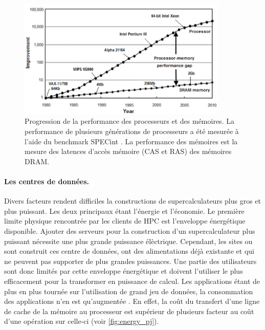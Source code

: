                 
        \begin{figure}
        \center
        \includegraphics[width=10cm]{images/cpu_cpu_vs_memory.png}
        \caption{\label{pic:cpuvsmemory} Progression de la performance des processeurs et des mémoires. La performance de plusieurs générations de processeurs a été mesurée à l'aide du benchmark SPECint \cite{Efnusheva2017ASO}. La performance des mémoires est la mesure des latences d’accès mémoire (CAS et RAS) des mémoires DRAM.}
        \end{figure}
                
             
    
        \paragraph{Les centres de données.} Divers facteurs rendent difficiles la constructions de supercalculateurs plus gros et plus puissant. Les deux principaux étant l'énergie et l'économie. Le première limite physique rencontrée par les clients de HPC est l'enveloppe énergétique disponible. Ajouter des serveurs pour la construction d'un supercalculateur plus puissant nécessite une plus grande puissance élèctrique. Cependant, les sites ou sont construit ces centre de données, ont des alimentations déjà existante et qui ne peuvent pas supporter de plus grandes puissances. Une partie des utilisateurs sont donc limités par cette enveloppe énergétique et doivent l'utiliser le plus efficacement pour la transformer en puissance de calcul. Les applications étant de plus en plus tournée sur l'utilisation de grand jeu de données, la consommation des applications n'en est qu'augmentée \cite{Kothe2016}. En effet, la coût du transfert d'une ligne de cache de la mémoire au processeur est supérieur de plusieurs facteur au coût d'une opération sur celle-ci (voir \autoref{fig:energy_pj}).
        
